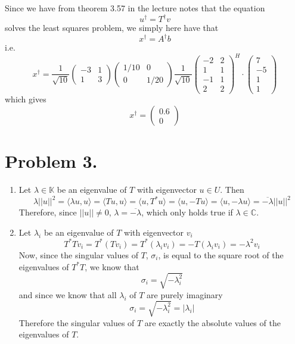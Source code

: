 \documentclass[a4paper,11pt]{article}
\begin{document}
Since we have from theorem 3.57 in the lecture notes that the equation
\[
    u^\dagger = T^\dagger v
\]
solves the least squares problem, we simply here have that
\[
    x^\dagger = A^\dagger b
\]
i.e.
\[
    x^\dagger = \frac{1}{\sqrt{10}} 
    \begin{pmatrix}
        -3 & 1 \\    
        1  & 3
    \end{pmatrix}
    \begin{pmatrix}
        1/10 & 0 \\
        0    & 1/20
    \end{pmatrix}
    \frac{1}{\sqrt{10}}
    \begin{pmatrix}
        -2 & 2 \\   
         1 & 1 \\
        -1 & 1 \\
         2 & 2
    \end{pmatrix}^H \cdot \begin{pmatrix} 7 \\ -5 \\ 1 \\ 1 \end{pmatrix}
\]
which gives
\[
    x^\dagger = \begin{pmatrix}
        0.6 \\ 0
    \end{pmatrix}
\]

\section*{Problem 3.}
\begin{enumerate}
    \item 
        Let $\lambda \in \mathbb{K}$ be an eigenvalue of $T$ with eigenvector $u \in U$. Then
        \[
            \lambda ||u||^2 = \langle \lambda u, u \rangle = \langle Tu, u \rangle = \langle u, T^*u \rangle = \langle u, -Tu \rangle = \langle u, -\lambda u \rangle = \overline{-\lambda}||u||^2
        \]
        Therefore, since $||u|| \neq 0$, $\lambda = \overline{-\lambda}$, which only holds true if $\lambda \in \mathbb{C}$.
    \item
        Let $\lambda_i$ be an eigenvalue of $T$ with eigenvector $v_i$
        \[
            T^*Tv_i = T^*(Tv_i) = T^*(\lambda_i v_i) = -T(\lambda_i v_i) = -\lambda^2 v_i
        \]
        Now, since the singular values of $T$, $\sigma_i$, is equal to the square root of the eigenvalues of
        $T^*T$, we know that 
        \[
            \sigma_i = \sqrt{-\lambda_i^2}
        \]
        and since we know that all $\lambda_i$ of $T$ are purely imaginary
        \[
            \sigma_i = \sqrt{-\lambda_i^2} = |\lambda_i|
        \]
        Therefore the singular values of $T$ are exactly the absolute values of the eigenvalues of $T$.
\end{enumerate}
\end{document}
